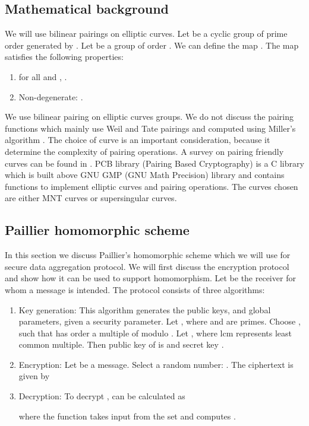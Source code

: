\documentclass[conference]{IEEEtran}[10pt]
\begin{document}
\subsection{Mathematical background}
\label{subsec:maths}
We will use bilinear pairings on elliptic curves. 
Let  be a cyclic  group of prime order  generated by
. Let  be a group of order . 
We can define 
the map 
. The map satisfies the following properties:
\begin{enumerate}
\item 
 for all  and , .
\item Non-degenerate: .
 
\end{enumerate}

We use bilinear pairing on elliptic curves groups. We do not discuss the pairing functions which mainly use
Weil and Tate pairings \cite{PBC} and computed using Miller's algorithm \cite{M86}.
The choice of curve is an important consideration, because it determine the complexity of pairing operations. 
A survey on pairing friendly curves can be found in \cite{FCT10}. 
PCB library (Pairing Based Cryptography) \cite{PBC}  is a C library which is built above GNU GMP (GNU Math Precision) library
and contains functions to implement elliptic curves and pairing operations. 
The curves chosen are either MNT curves or supersingular curves. 

\subsection{Paillier homomorphic scheme}
\label{subsec:paillier}
In this section we discuss Paillier's \cite{P99} homomorphic scheme which we will use for secure data aggregation protocol.
We will first discuss the encryption protocol and show how it can be used to support homomorphism.
Let  be the receiver for whom a message is intended. The protocol consists of three algorithms:

\begin{enumerate}
\item Key generation: This algorithm generates the public keys, and global parameters, given a security parameter.
Let , where  and  are primes.
Choose , such that  has order a multiple of  modulo .
Let , where lcm represents least common multiple.
Then public key of  is  and secret key .

\item Encryption: Let  be a message.
Select a random number: .
The ciphertext  is given by


\item Decryption:
To decrypt ,  can be calculated as
 
where the function takes input from the set  and computes . 
\end{enumerate}
\end{document}
